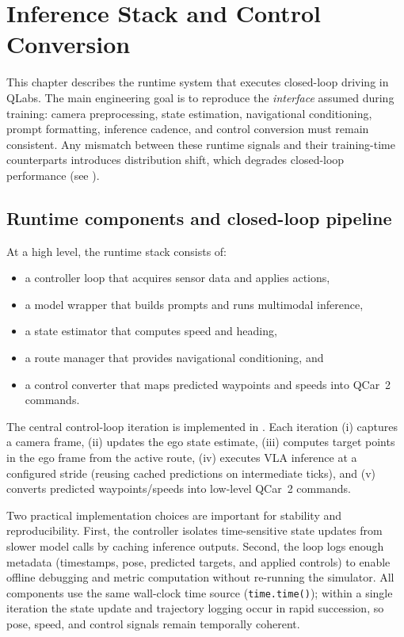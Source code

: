 \chapter{Inference Stack and Control Conversion}
\label{ch:inference}

This chapter describes the runtime system that executes closed-loop driving in QLabs. The main engineering goal is to reproduce the \emph{interface} assumed during training: camera preprocessing, state estimation, navigational conditioning, prompt formatting, inference cadence, and control conversion must remain consistent. Any mismatch between these runtime signals and their training-time counterparts introduces distribution shift, which degrades closed-loop performance (see ).

\section{Runtime components and closed-loop pipeline}
\label{sec:runtime-components}
At a high level, the runtime stack consists of:
\begin{itemize}[leftmargin=*,itemsep=0.25em]
  \item a controller loop that acquires sensor data and applies actions,
  \item a model wrapper that builds prompts and runs multimodal inference,
  \item a state estimator that computes speed and heading, 
  \item a route manager that provides navigational conditioning, and
  \item a control converter that maps predicted waypoints and speeds into QCar~2 commands.
\end{itemize}

The central control-loop iteration is implemented in . Each iteration (i) captures a camera frame, (ii) updates the ego state estimate, (iii) computes target points in the ego frame from the active route, (iv) executes VLA inference at a configured stride (reusing cached predictions on intermediate ticks), and (v) converts predicted waypoints/speeds into low-level QCar~2 commands.

Two practical implementation choices are important for stability and reproducibility. First, the controller isolates time-sensitive state updates from slower model calls by caching inference outputs. Second, the loop logs enough metadata (timestamps, pose, predicted targets, and applied controls) to enable offline debugging and metric computation without re-running the simulator. All components use the same wall-clock time source (\texttt{time.time()}); within a single iteration the state update and trajectory logging occur in rapid succession, so pose, speed, and control signals remain temporally coherent.

